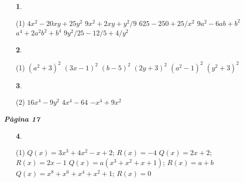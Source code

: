 \documentclass[a4paper, pdf, twoside]{book}
\begin{document}
\begin{multicols}{2}
\begin{enumerate}

 \item[\fontfamily{phv}\selectfont\color{blue}\textbf{1}. ] 
 \begin{tasks}[column-sep=1em, item-indent=1.3333em](1)
	 \task $4x^2-20xy+25y^2$
	 \task $9x^2 +2xy+y^2/9$
	 \task $625-250+25/x^2$
	 \task $9a^2-6ab+b^2$
	 \task $a^4+2a^2b^2+b^4$
	 \task $9y^2/25 - 12/5+4/y^2$
\end{tasks}
 \end{enumerate}
\begin{enumerate}
\vspace{0.25cm}



 \item[\fontfamily{phv}\selectfont\color{blue}\textbf{2}. ] 
 \begin{tasks}[column-sep=1em, item-indent=1.3333em](1)
	 \task $(a^2+3)^2$
	 \task $(3x-1)^2$
	 \task $(b-5)^2$
	 \task $(2y+3)^2$
	 \task $(a^2-1)^2$
	 \task $(y^2+3)^2$
\end{tasks}
\vspace{0.25cm}



 \item[\fontfamily{phv}\selectfont\color{blue}\textbf{3}. ] 
 \begin{tasks}[column-sep=1em, item-indent=1.3333em](2)
	 \task $16x^4-9y^2$
	 \task $4x^4-64$
	 \task $-x^4+9x^2$
\end{tasks}
 \end{enumerate}
\vspace{0.3cm}


{\textbf{\em Pàgina 17}} \hrulefill
\begin{enumerate}
\vspace{0.25cm}



 \item[\fontfamily{phv}\selectfont\color{blue}\textbf{4}. ]  \scalebox{0.6}{\simbolclau } 
 \begin{tasks}[column-sep=1em, item-indent=1.3333em](1)
	 \task*  $Q(x)=3x^{3}+4x^{2}-x+2$; $R(x)=-4$
	 \task $Q(x)=2x+2$; $R(x)=2x-1$
	 \task* $Q(x)=a(x^{3}+ x^{2}+ x+ 1)$; $R(x)=a+b$
	 \task* $Q(x)=x^{8}+ x^{6}+ x^{4}+ x^{2}+ 1$; $R(x)=0$ 
\end{tasks}
 \end{enumerate}
\begin{enumerate}
\vspace{0.25cm}



\end{enumerate}
\end{multicols}
\end{document}
